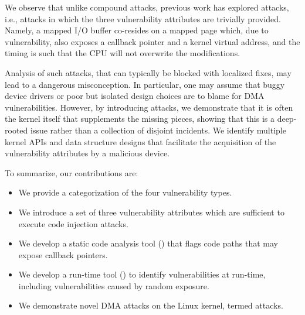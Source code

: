 We observe that unlike compound attacks, previous work has explored \simple{} attacks, i.e., attacks in which the three vulnerability attributes are trivially provided. 
Namely, a mapped I/O buffer co-resides on a mapped page which, due to \subpage{} vulnerability, also exposes a callback pointer and a kernel virtual address, and the timing is such that the CPU will not overwrite the modifications.

Analysis of such \simple{} attacks, that can typically be blocked with localized fixes, may lead to a dangerous misconception. In particular, one may assume that buggy device drivers or poor but isolated design choices are to blame for DMA vulnerabilities.
However, by introducing \compound attacks, we demonstrate that it is often the kernel itself that supplements the missing pieces, showing that this is a deep-rooted issue rather than a collection of disjoint incidents.
We identify multiple kernel APIs and data structure designs that facilitate the acquisition of the vulnerability attributes by a malicious device.


To summarize, our contributions are:
\begin{itemize}
    \item We provide a categorization of the four \subpage{} vulnerability types.
    \item We introduce a set of three vulnerability attributes which are sufficient to execute code injection attacks.
    \item We develop a static code analysis tool (\tool) that flags code paths that may expose callback pointers.
    \item We develop a run-time tool (\dkasan) to identify \subpage{} vulnerabilities at run-time, including vulnerabilities caused by random exposure.
    \item We demonstrate novel DMA attacks on the Linux kernel, termed \compound{} attacks.
\end{itemize}

